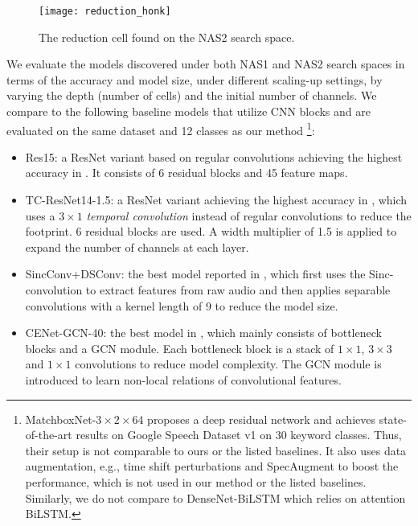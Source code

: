 \documentclass[a4paper]{article}
\begin{document}
\begin{figure}[!t]
    \centering
    \texttt{[image: reduction\_honk]}
    \vspace{-10.5mm}
    \caption{The reduction cell found on the NAS2 search space.}
    \label{fig:reduction_honk}
\end{figure}


We evaluate the models discovered under both NAS1 and NAS2 search spaces in terms of the accuracy and model size, under different scaling-up settings, by varying the depth (number of cells) and the initial number of channels.  
We compare to the following baseline models that 
utilize CNN blocks and 
are evaluated on the same dataset and 12 classes as our method \footnote{MatchboxNet-$3\times2\times64$ \cite{majumdar2020matchboxnet} proposes a deep residual network and achieves state-of-the-art results on Google Speech Dataset v1 on 30 keyword classes. Thus, their setup is not comparable to ours or the listed baselines. It also uses data augmentation, e.g., time shift perturbations and SpecAugment to boost the performance, which is not used in our method or the listed baselines. 
Similarly, we do not compare to DenseNet-BiLSTM \cite{zeng2019effective} which relies on attention BiLSTM.
}:
\begin{itemize}
    \item Res15: a ResNet variant based on regular convolutions achieving the highest accuracy in \cite{tang2018deep}. It consists of 6 residual blocks and 45 feature maps. \item TC-ResNet14-1.5: a ResNet variant achieving the highest accuracy in \cite{choi2019temporal}, which uses a $3 \times 1$ \textit{temporal convolution} instead of regular convolutions to reduce the footprint. 6 residual blocks are used. A width multiplier of 1.5 is applied to expand the number of channels at each layer.
    \item SincConv+DSConv: the best model reported in \cite{mittermaier2019small}, which first uses the Sinc-convolution to extract features from raw audio and then applies separable convolutions with a kernel length of 9 to reduce the model size.
    \item CENet-GCN-40: the best model in \cite{chen2019small}, which mainly consists of bottleneck blocks and a GCN module. Each bottleneck block is a stack of $1\times1$, $3\times3$ and $1\times1$ convolutions to reduce model complexity. The GCN module is introduced to learn non-local relations of convolutional features. \end{itemize}
\end{document}
